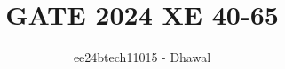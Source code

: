 \documentclass[journal]{IEEEtran}
\begin{document}

\vspace{3cm}


\title{GATE 2024 XE 40-65}
\author{ee24btech11015 - Dhawal}
\maketitle
{\let\newpage\relax\maketitle}

\renewcommand{\thefigure}{\theenumi}
\renewcommand{\thetable}{\theenumi}
\setlength{\intextsep}{10pt} %
\end{document}
